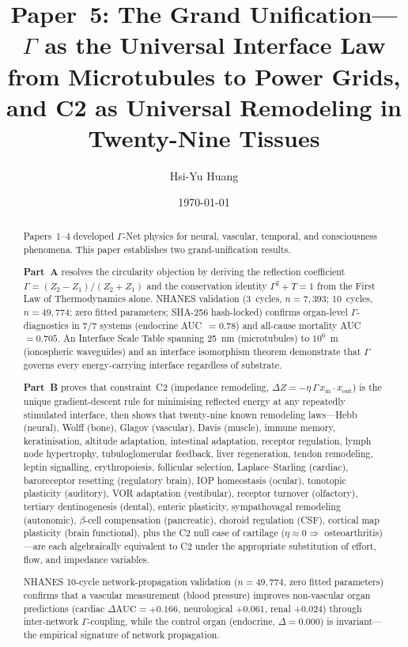 \documentclass[aps,pre,twocolumn,superscriptaddress,floatfix]{revtex4-2}
\begin{document}
\title{Paper~5: The Grand Unification---$\Gamma$ as the
Universal Interface Law from Microtubules to Power Grids,
and C2 as Universal Remodeling in Twenty-Nine Tissues}

\author{Hsi-Yu Huang}

\date{\today}


\begin{abstract}
Papers~1--4 developed $\Gamma$-Net physics for neural,
vascular, temporal, and consciousness phenomena.
This paper establishes two grand-unification results.

\textbf{Part~A} resolves the circularity objection
by deriving the reflection coefficient
$\Gamma = (Z_2 - Z_1)/(Z_2 + Z_1)$ and the conservation
identity $\Gamma^2 + T = 1$ from the First Law of
Thermodynamics alone.
NHANES validation (3~cycles, $n = 7{,}393$; 10~cycles,
$n = 49{,}774$; zero fitted parameters; SHA-256
hash-locked) confirms organ-level $\Gamma$-diagnostics
in 7/7 systems (endocrine AUC~$= 0.78$) and all-cause
mortality AUC~$= 0.705$.
An Interface Scale Table spanning 25~nm (microtubules)
to $10^6$~m (ionospheric waveguides) and an interface
isomorphism theorem demonstrate that $\Gamma$ governs
every energy-carrying interface regardless of substrate.

\textbf{Part~B} proves that constraint~C2 (impedance
remodeling, $\Delta Z = -\eta\,\Gamma\,x_{\text{in}}
\cdot x_{\text{out}}$) is the unique gradient-descent
rule for minimising reflected energy at any repeatedly
stimulated interface, then shows that twenty-nine known
remodeling laws---Hebb (neural), Wolff (bone), Glagov
(vascular), Davis (muscle), immune memory, keratinisation,
altitude adaptation, intestinal adaptation, receptor
regulation, lymph node hypertrophy, tubuloglomerular
feedback, liver regeneration, tendon remodeling, leptin
signalling, erythropoiesis, follicular selection,
Laplace--Starling (cardiac), baroreceptor resetting
(regulatory brain),
IOP homeostasis (ocular), tonotopic plasticity (auditory),
VOR adaptation (vestibular), receptor turnover (olfactory),
tertiary dentinogenesis (dental), enteric plasticity,
sympathovagal remodeling (autonomic),
$\beta$-cell compensation (pancreatic),
choroid regulation (CSF),
cortical map plasticity (brain functional),
plus the C2 null case of cartilage
($\eta \approx 0 \Rightarrow$ osteoarthritis)---are
each algebraically equivalent to C2 under the appropriate
substitution of effort, flow, and impedance variables.

NHANES 10-cycle network-propagation validation ($n=49{,}774$,
zero fitted parameters) confirms that a vascular measurement
(blood pressure) improves non-vascular organ predictions
(cardiac $\Delta\text{AUC} = +0.166$, neurological $+0.061$,
renal $+0.024$) through inter-network $\Gamma$-coupling,
while the control organ (endocrine, $\Delta = 0.000$) is
invariant---the empirical signature of network propagation.
\end{abstract}
\end{document}
